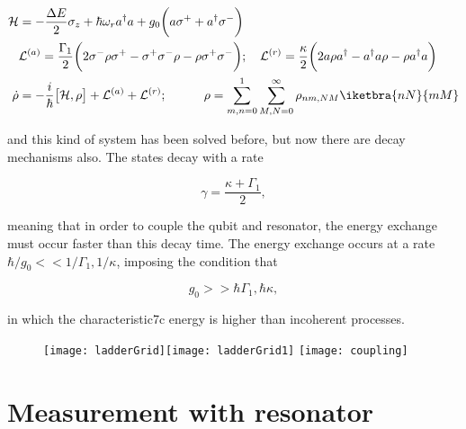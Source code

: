 \noindent {}

\begin{equation}\label{ar1}
  \begin{aligned}
    \mathcal{H} & ={-\frac{\Delta E}{2}\sigma_z}+{{\hbar\omega_r}a^\dagger a} + {g_0\bigg({a\sigma^+}+{a^{\dagger}\sigma^-}\bigg)}\\
    &\mathcal{L}^{(a)} = \frac{\Gamma_1}{2}\bigg(2\sigma^{-}\rho \sigma^{+}-\sigma^{+}\sigma^{-}\rho-\rho \sigma^{+}\sigma^{-}\bigg);\quad\mathcal{L}^{(r)} = \frac{\kappa}{2}\bigg(2a\rho a^{\dagger}-a^{\dagger}a\rho-\rho a^{\dagger}a\bigg)\\
    \dot{\rho} & = -\frac{i}{\hbar}\big[\mathcal{H},\rho\big]+\mathcal{L}^{(a)}+\mathcal{L}^{(r)};\quad\quad\quad \rho = \sum_{m,n=0}^{1}\sum_{M,N=0}^{\infty}\rho_{nm,NM}\iketbra{nN}{mM}\\
  \end{aligned}
\end{equation}

\noindent and  this kind  of system  has been
solved  before,  but   now  there  are  decay
mechanisms  also.  The  states  decay with  a
rate

\begin{equation}\label{ardecay}
  \gamma=\frac{\kappa+\Gamma_1}{2},
\end{equation}

\noindent meaning that in order to couple the
qubit and resonator, the energy exchange must
occur  faster  than  this  decay  time.   The
energy    exchange   occurs    at   a    rate
$ \hbar/g_0 << 1/\Gamma_1,1/\kappa$, imposing
the condition that

\begin{equation}\label{arD}
  g_0>>\hbar\Gamma_1,\hbar\kappa,
\end{equation}

\noindent   in  which   the  characteristic7c
energy is higher than incoherent processes.

\begin{figure}[h]
  \centering%
  \texttt{[image: ladderGrid]}\texttt{[image: ladderGrid1]}
  \texttt{[image: coupling]}
\end{figure}


\newpage
\section{Measurement with resonator}
\label{sec:meas-with-reson}

